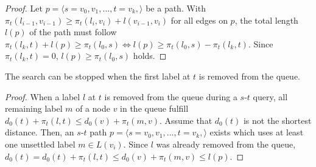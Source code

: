 \begin{proof}
	Let $p = \langle s=v_0,v_1,...,t=v_k, \rangle$ be a path. With $\pi_t(l_{i-1},v_{i-1}) \ge \pi_t(l_i,v_i) + l(v_{i-1},v_i)$ for all edges on $p$, the total length $l(p)$ of the path must follow $\pi_t(l_k,t) + l(p) \ge \pi_t(l_0,s) \Leftrightarrow l(p) \ge \pi_t(l_0,s) - \pi_t(l_k,t)$. Since $\pi_t(l_k,t) = 0$, $l(p) \ge \pi_t(l_0,s)$ holds.
\end{proof}

\begin{theorem}
	The search can be stopped when the first label at $t$ is removed from the queue.
\end{theorem}

\begin{proof}
	When a label $l$ at $t$ is removed from the queue during a $s$-$t$ query, all remaining label $m$ of a node $v$ in the queue fulfill $d_0(t) + \pi_t(l,t) \le d_0(v) + \pi_t(m,v)$. Assume that $d_0(t)$ is not the shortest distance. Then, an $s$-$t$ path $p = \langle s=v_0,v_1,...,t=v_k, \rangle$ exists which uses at least one unsettled label $m \in L(v_i)$. Since $l$ was already removed from the queue, $d_0(t) = d_0(t) + \pi_t(l,t) \le  d_0(v) + \pi_t(m,v) \le l(p)$.
\end{proof}


